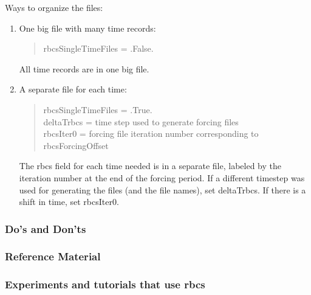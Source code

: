 \noindent
Ways to organize the files:
\begin{enumerate}
\item One big file with many time records:
  \begin{quote}
     rbcsSingleTimeFiles = .False.
  \end{quote}
  All time records are in one big file.

\item A separate file for each time:
  \begin{quote}
     rbcsSingleTimeFiles = .True.\\
     deltaTrbcs = time step used to generate forcing files\\
     rbcsIter0 = forcing file iteration number corresponding to rbcsForcingOffset
  \end{quote}
  The rbcs field for each time needed is in a separate file, labeled by the
  iteration number at the end of the forcing period.  If a different timestep
  was used for generating the files (and the file names), set deltaTrbcs.
  If there is a shift in time, set rbcsIter0.
\end{enumerate}



\subsubsection{Do's and Don'ts}

\subsubsection{Reference Material}

\subsubsection{Experiments and tutorials that use rbcs}
\label{sec:pkg:rbcs:experiments}




